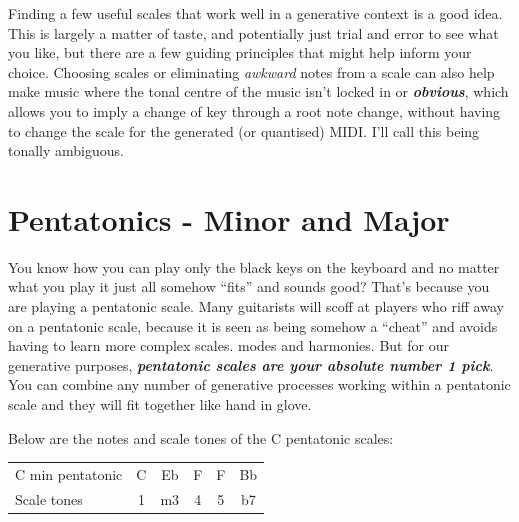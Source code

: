 \documentclass[
  12pt,
  letterpaper,
  oneside,
  open=any]{scrbook}
\begin{document}
\begin{tcolorbox}[enhanced jigsaw, opacitybacktitle=0.6, rightrule=.15mm, leftrule=.75mm, opacityback=0, toptitle=1mm, toprule=.15mm, breakable, titlerule=0mm, colback=white, bottomtitle=1mm, title=\textcolor{quarto-callout-tip-color}{\faLightbulb}\hspace{0.5em}{Key idea}, coltitle=black, left=2mm, colframe=quarto-callout-tip-color-frame, bottomrule=.15mm, colbacktitle=quarto-callout-tip-color!10!white, arc=.35mm]

Finding a few useful scales that work well in a generative context is a
good idea. This is largely a matter of taste, and potentially just trial
and error to see what you like, but there are a few guiding principles
that might help inform your choice. Choosing scales or eliminating
\emph{awkward} notes from a scale can also help make music where the
tonal centre of the music isn't locked in or \textbf{\emph{obvious}},
which allows you to imply a change of key through a root note change,
without having to change the scale for the generated (or quantised)
MIDI. I'll call this being tonally ambiguous.

\end{tcolorbox}

\section{Pentatonics - Minor and
Major}\label{pentatonics---minor-and-major}

You know how you can play only the black keys on the keyboard and no
matter what you play it just all somehow ``fits'' and sounds good?
That's because you are playing a pentatonic scale. Many guitarists will
scoff at players who riff away on a pentatonic scale, because it is seen
as being somehow a ``cheat'' and avoids having to learn more complex
scales. modes and harmonies. But for our generative purposes,
\textbf{\emph{pentatonic scales are your absolute number 1 pick}}. You
can combine any number of generative processes working within a
pentatonic scale and they will fit together like hand in glove.

Below are the notes and scale tones of the C pentatonic scales:

\begin{longtable}[]{@{}lccccc@{}}
\toprule\noalign{}
\endhead
\bottomrule\noalign{}
\endlastfoot
C min pentatonic & C & Eb & F & F & Bb \\
Scale tones & 1 & m3 & 4 & 5 & b7 \\
\end{longtable}
\end{document}
